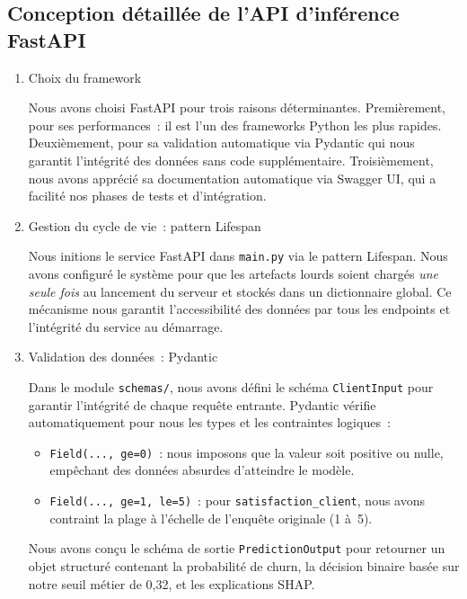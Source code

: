 \subsection{Conception détaillée de l'API d'inférence FastAPI}

\begin{enumerate}
    \item Choix du framework

Nous avons choisi FastAPI pour trois raisons déterminantes.
Premièrement, pour ses performances~: il est l'un des frameworks Python les plus rapides. Deuxièmement, pour sa
validation automatique via Pydantic qui nous garantit l'intégrité des données sans code supplémentaire. Troisièmement, nous avons apprécié sa
documentation automatique via Swagger UI, qui a facilité nos phases de tests et
d'intégration.

\item Gestion du cycle de vie~: pattern Lifespan

Nous initions le service FastAPI dans \texttt{main.py} via le
pattern Lifespan. Nous avons configuré le système pour que les artefacts lourds soient chargés \textit{une
seule fois} au lancement du serveur et stockés dans un dictionnaire
global. Ce
mécanisme nous garantit l'accessibilité des données par tous les endpoints et l'intégrité du service au démarrage.

\item Validation des données~: Pydantic

Dans le module \texttt{schemas/}, nous avons défini le schéma \texttt{ClientInput} pour
garantir l'intégrité de chaque requête entrante. Pydantic vérifie
automatiquement pour nous les types et les contraintes logiques~:

\begin{itemize}
    \item \texttt{Field(..., ge=0)}~: nous imposons que la valeur soit positive ou nulle, empêchant
    des données absurdes d'atteindre le modèle.

    \item \texttt{Field(..., ge=1, le=5)}~: pour
    \texttt{satisfaction\_client}, nous avons contraint la plage à
    l'échelle de l'enquête originale (1 à~5).
\end{itemize}

Nous avons conçu le schéma de sortie \texttt{PredictionOutput} pour retourner un objet
structuré contenant la probabilité de churn, la décision binaire
basée sur notre seuil métier de 0,32, et les explications SHAP.


\end{enumerate}
